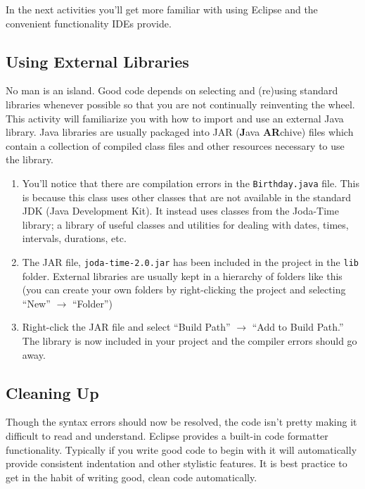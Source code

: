 \documentclass[12pt]{scrartcl}
\begin{document}
In the next activities you'll get more familiar with using Eclipse and the
convenient functionality IDEs provide.  

\subsection{Using External Libraries}

No man is an island.  Good code depends on selecting and (re)using 
standard libraries whenever possible so that you are not continually reinventing the wheel.  This activity will familiarize you with how 
to import and use an external Java library.  Java libraries are 
usually packaged into JAR (\textbf{J}ava \textbf{AR}chive) files 
which contain a collection of compiled class files and other resources necessary to use the library.

\begin{enumerate}
  \item You'll notice that there are compilation errors in the 
  	\texttt{Birthday.java} file.  This is because this 
	class uses other classes that are not available in the standard 
	JDK (Java Development Kit).  It instead uses classes from the 
	Joda-Time library; a library of useful classes and utilities for 
	dealing with dates, times, intervals, durations, etc.
  \item The JAR file, \texttt{joda-time-2.0.jar} has
    been included in the project in the \texttt{lib} folder.
    External libraries are usually kept in a hierarchy of folders
    like this (you can create your own folders by right-clicking 
    the project and selecting ``New'' $\rightarrow$ ``Folder'')
  \item Right-click the JAR file and select ``Build Path'' $\rightarrow$ 
  	``Add to Build Path.''  The library is now included in your project
	and the compiler errors should go away.
\end{enumerate}

\subsection{Cleaning Up}

Though the syntax errors should now be resolved, the code isn't pretty
making it difficult to read and understand.  Eclipse provides a built-in
code formatter functionality.  Typically if you write good code to begin
with it will automatically provide consistent indentation and other stylistic
features.  It is best practice to get in the habit of writing good, clean
code automatically.  
\end{document}
